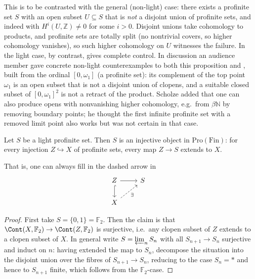 \begin{remark}
\label{rmk:2:general-open-wild}
This is to be contrasted with the general (non-light) case: there exists a
profinite set $S$ with an open subset $U\subseteq S$ that is \emph{not} a disjoint
union of profinite sets, and indeed with $H^i(U,\mathbb{Z})\neq 0$ for some
$i>0$. Disjoint unions take cohomology to products, and profinite sets are
totally split (no nontrivial covers, so higher cohomology vanishes), so such
higher cohomology on $U$ witnesses the failure. In the light case, by contrast,
 gives complete control. In discussion an audience
member gave concrete non-light counterexamples to both this proposition and
, built from the ordinal $[0,\omega_1]$ (a profinite set):
its complement of the top point $\omega_1$ is an open subset that is not a
disjoint union of clopens, and a suitable closed subset of $[0,\omega_1]^2$ is
not a retract of the product. Scholze added that one can also produce opens with
nonvanishing higher cohomology, e.g.\ from $\beta\mathbb{N}$ by removing boundary
points; he thought the first infinite profinite set with a removed limit point
also works but was not certain in that case.
\end{remark}

\begin{proposition}[Injectivity]
\label{prop:2:injective}
Let $S$ be a light profinite set. Then $S$ is an injective object in
$\mathrm{Pro}(\mathrm{Fin})$: for every injection $Z\hookrightarrow X$ of
profinite sets, every map $Z\to S$ extends to $X$.
\end{proposition}

That is, one can always fill in the dashed arrow in
\[
\begin{tikzcd}
Z \arrow[r] \arrow[d, hook] & S \\
X \arrow[ur, dashed, "\exists"']
\end{tikzcd}
\]

\begin{proof}
First take $S=\{0,1\}=\mathbb{F}_2$. Then the claim is that
$\Cont(X,\mathbb{F}_2)\to\Cont(Z,\mathbb{F}_2)$ is surjective, i.e.\ any clopen
subset of $Z$ extends to a clopen subset of $X$. In general write
$S=\varprojlim_n S_n$ with all $S_{n+1}\to S_n$ surjective and induct on $n$:
having extended the map to $S_n$, decompose the situation into the disjoint union
over the fibres of $S_{n+1}\to S_n$, reducing to the case $S_n=\ast$ and hence to
$S_{n+1}$ finite, which follows from the $\mathbb{F}_2$-case.
\end{proof}

